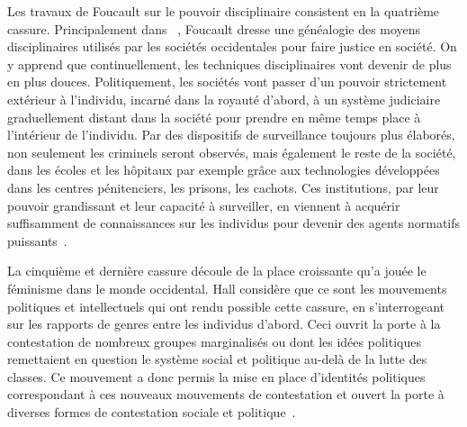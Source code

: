 Les travaux de Foucault sur le pouvoir disciplinaire consistent en la quatrième cassure.
Principalement dans ~\citeyearpar{Foucault2004a}, Foucault dresse une généalogie des moyens disciplinaires utilisés par les sociétés occidentales pour faire justice en société.
On y apprend que continuellement, les techniques disciplinaires vont devenir de plus en plus douces.
Politiquement, les sociétés vont passer d'un pouvoir strictement extérieur à l'individu, incarné dans la royauté d'abord, à un système judiciaire graduellement distant dans la société pour prendre en même temps place à l'intérieur de l'individu.
Par des dispositifs de surveillance toujours plus élaborés, non seulement les criminels seront observés, mais également le reste de la société, dans les écoles et les hôpitaux par exemple grâce aux technologies développées dans les centres pénitenciers, les prisons, les cachots.
Ces institutions, par leur pouvoir grandissant et leur capacité à surveiller, en viennent à acquérir suffisamment de connaissances sur les individus pour devenir des agents normatifs puissants~\citep[608--609]{Hall1996a}.

La cinquième et dernière cassure découle de la place croissante qu'a jouée le féminisme dans le monde occidental.
Hall considère que ce sont les mouvements politiques et intellectuels qui ont rendu possible cette cassure, en s'interrogeant sur les rapports de genres entre les individus d'abord.
Ceci ouvrit la porte à la contestation de nombreux groupes marginalisés ou dont les idées politiques remettaient en question le système social et politique au-delà de la lutte des classes.
Ce mouvement a donc permis la mise en place d'identités politiques correspondant à ces nouveaux mouvements de contestation et ouvert la porte à diverses formes de contestation sociale et politique~\citeyearpar[610]{Hall1996a}.

